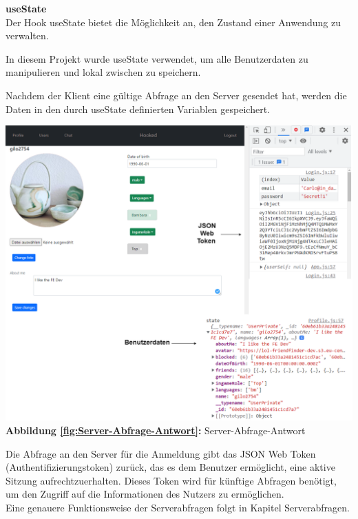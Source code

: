 \textbf{useState}
\\
Der Hook useState bietet die Möglichkeit an, den Zustand einer Anwendung zu verwalten.

In diesem Projekt wurde useState verwendet, um alle Benutzerdaten zu manipulieren und lokal zwischen zu speichern.

Nachdem der Klient eine gültige Abfrage an den Server gesendet hat, werden die Daten in den durch useState definierten Variablen gespeichert.
\begin{center}
  \includegraphics[scale=0.35]
  {sources/Server-Abfrage-Antwort}\label{fig:Server-Abfrage-Antwort}\\
  \textbf{Abbildung \autoref{fig:Server-Abfrage-Antwort}:} Server-Abfrage-Antwort
\end{center}

Die Abfrage an den Server für die Anmeldung gibt das JSON Web Token\\(Authentifizierungstoken){\cite{RFC7519}} zurück, das es dem Benutzer ermöglicht, eine aktive Sitzung aufrechtzuerhalten. Dieses Token wird für künftige Abfragen benötigt, um den Zugriff auf die Informationen des Nutzers zu ermöglichen.
\\
Eine genauere Funktionsweise der Serverabfragen folgt in Kapitel Serverabfragen.
\\

